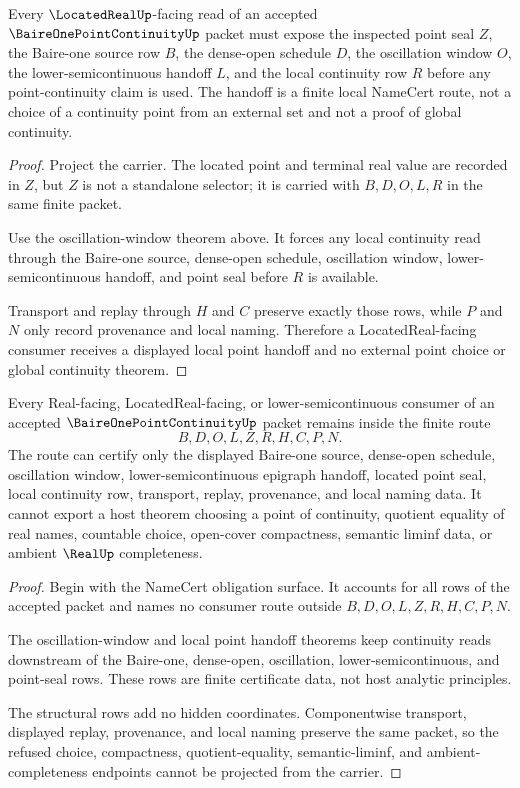 \begin{theorem}
\label{thm:baire-one-point-continuity-local-point-handoff}
Every $\LocatedRealUp$-facing read of an accepted $\BaireOnePointContinuityUp$ packet must expose the inspected point seal $Z$, the Baire-one source row $B$, the dense-open schedule $D$, the oscillation window $O$, the lower-semicontinuous handoff $L$, and the local continuity row $R$ before any point-continuity claim is used. The handoff is a finite local NameCert route, not a choice of a continuity point from an external set and not a proof of global continuity.
\end{theorem}
\begin{proof}
Project the carrier. The located point and terminal real value are recorded in $Z$, but $Z$ is not a standalone selector; it is carried with $B,D,O,L,R$ in the same finite packet.

Use the oscillation-window theorem above. It forces any local continuity read through the Baire-one source, dense-open schedule, oscillation window, lower-semicontinuous handoff, and point seal before $R$ is available.

Transport and replay through $H$ and $C$ preserve exactly those rows, while $P$ and $N$ only record provenance and local naming. Therefore a LocatedReal-facing consumer receives a displayed local point handoff and no external point choice or global continuity theorem.
\end{proof}

\begin{theorem}
\label{thm:baire-one-point-continuity-nonescape}
Every Real-facing, LocatedReal-facing, or lower-semicontinuous consumer of an accepted $\BaireOnePointContinuityUp$ packet remains inside the finite route
$$
B,D,O,L,Z,R,H,C,P,N .
$$
The route can certify only the displayed Baire-one source, dense-open schedule, oscillation window, lower-semicontinuous epigraph handoff, located point seal, local continuity row, transport, replay, provenance, and local naming data. It cannot export a host theorem choosing a point of continuity, quotient equality of real names, countable choice, open-cover compactness, semantic liminf data, or ambient $\RealUp$ completeness.
\end{theorem}
\begin{proof}
Begin with the NameCert obligation surface. It accounts for all rows of the accepted packet and names no consumer route outside $B,D,O,L,Z,R,H,C,P,N$.

The oscillation-window and local point handoff theorems keep continuity reads downstream of the Baire-one, dense-open, oscillation, lower-semicontinuous, and point-seal rows. These rows are finite certificate data, not host analytic principles.

The structural rows add no hidden coordinates. Componentwise transport, displayed replay, provenance, and local naming preserve the same packet, so the refused choice, compactness, quotient-equality, semantic-liminf, and ambient-completeness endpoints cannot be projected from the carrier.
\end{proof}

